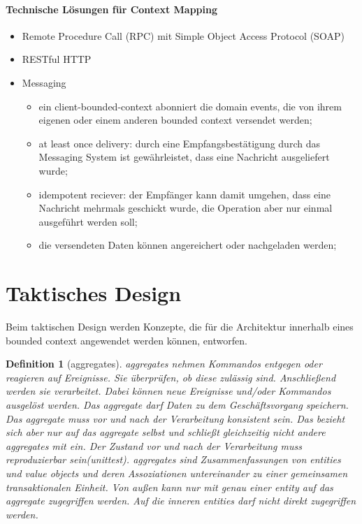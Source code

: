 \documentclass[11pt,a4paper]{scrartcl}
\newtheorem{Def}{Definition}[section]
\begin{document}
\paragraph{Technische Lösungen für Context Mapping}
\begin{itemize}
	\item Remote Procedure Call (RPC) mit Simple Object Access Protocol (SOAP)
	\item RESTful HTTP
	\item Messaging
	\begin{itemize}
		\item ein client-bounded-context abonniert die domain events, die von ihrem eigenen oder einem anderen bounded context versendet werden;
		\item at least once delivery: durch eine Empfangsbestätigung durch das Messaging System ist gewährleistet, dass eine Nachricht ausgeliefert wurde;
		\item idempotent reciever: der Empfänger kann  damit umgehen, dass eine Nachricht mehrmals geschickt wurde, die Operation aber nur einmal ausgeführt werden soll;
		\item die versendeten Daten können angereichert oder nachgeladen werden;
	\end{itemize}
\end{itemize}

\section{Taktisches Design}

Beim taktischen Design werden Konzepte, die für die Architektur innerhalb eines bounded context angewendet werden können, entworfen.

\begin{Def}[aggregates]
	aggregates nehmen Kommandos entgegen oder reagieren auf Ereignisse.
	Sie überprüfen, ob diese zulässig sind.
	Anschließend werden sie verarbeitet. Dabei können neue Ereignisse und/oder Kommandos ausgelöst werden.
	Das aggregate darf Daten zu dem Geschäftsvorgang speichern. 
	Das aggregate muss vor und nach der Verarbeitung konsistent sein.
	Das bezieht sich aber nur auf das aggregate selbst und schließt gleichzeitig nicht andere aggregates mit ein.
	Der Zustand vor und nach der Verarbeitung muss reproduzierbar sein(unittest).
	aggregates sind Zusammenfassungen von entities und value objects und deren Assoziationen untereinander zu einer gemeinsamen transaktionalen Einheit.
	Von außen kann nur mit genau einer entity auf das aggregate zugegriffen werden.
	Auf die inneren entities darf nicht direkt zugegriffen werden.
\end{Def}
\end{document}
